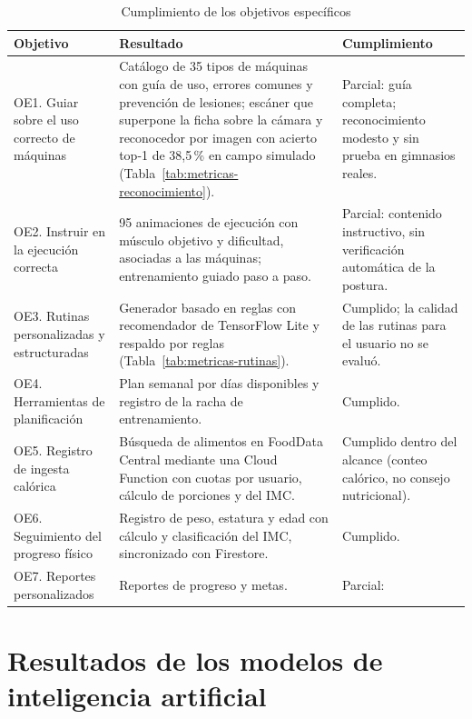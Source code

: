 \begin{table}[H]
\centering
\caption{Cumplimiento de los objetivos específicos}
\label{tab:res-objetivos}
\small
\begin{tabularx}{\textwidth}{|L{2.9cm}|Y|L{3.5cm}|}
\hline
{} \textbf{Objetivo} & \textbf{Resultado} & \textbf{Cumplimiento} \\
\hline
OE1. Guiar sobre el uso correcto de máquinas &
Catálogo de 35 tipos de máquinas con guía de uso, errores comunes y
prevención de lesiones; escáner que superpone la ficha sobre la cámara y
reconocedor por imagen con acierto top-1 de 38,5\,\% en campo simulado
(Tabla~\ref{tab:metricas-reconocimiento}). & Parcial: guía completa;
reconocimiento modesto y sin prueba en gimnasios reales. \\ \hline
OE2. Instruir en la ejecución correcta &
95 animaciones de ejecución con músculo objetivo y dificultad, asociadas a las
máquinas; entrenamiento guiado paso a paso. &
Parcial: contenido instructivo, sin verificación automática de la postura. \\ \hline
OE3. Rutinas personalizadas y estructuradas &
Generador basado en reglas con recomendador de TensorFlow Lite y respaldo por
reglas (Tabla~\ref{tab:metricas-rutinas}). &
Cumplido; la calidad de las rutinas para el usuario no se evaluó. \\ \hline
OE4. Herramientas de planificación &
Plan semanal por días disponibles y registro de la racha de entrenamiento. &
Cumplido. \\ \hline
OE5. Registro de ingesta calórica &
Búsqueda de alimentos en FoodData Central mediante una Cloud Function con
cuotas por usuario, cálculo de porciones y del IMC. &
Cumplido dentro del alcance (conteo calórico, no consejo nutricional). \\ \hline
OE6. Seguimiento del progreso físico &
Registro de peso, estatura y edad con cálculo y clasificación del IMC,
sincronizado con Firestore. & Cumplido. \\ \hline
OE7. Reportes personalizados &
Reportes de progreso y metas. &
Parcial:  \\
\hline
\end{tabularx}
\end{table}

\section{Resultados de los modelos de inteligencia artificial}
\label{sec:res-ia}

